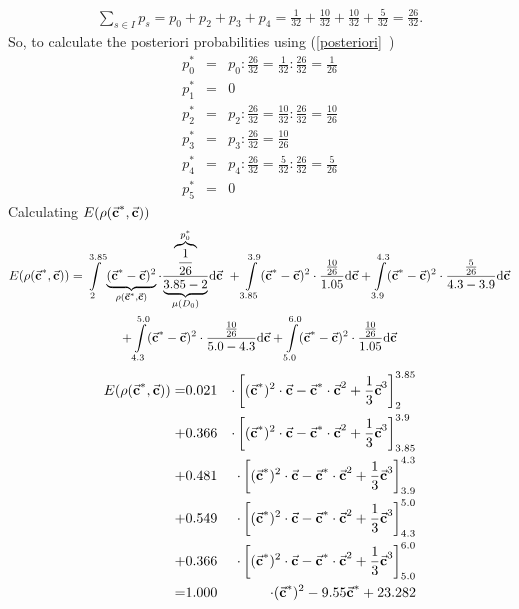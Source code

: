 \begin{gather*}
\sum\limits_{s \in I}p_{s}=p_{0}+p_{2}+p_{3}+p_{4}= \frac{1}{32} + \frac{10}{32} + \frac{10}{32} + \frac{5}{32} = \frac{26}{32}.
\end{gather*}
So, to calculate the posteriori probabilities using (\vref{posteriori}~)
\begin{eqnarray*}
p_{0}^{*} &=& p_{0}: \frac{26}{32} = \frac{1}{32} : \frac{26}{32} = \frac{1}{26} \\
p_{1}^{*} &=& 0 \\
p_{2}^{*} &=& p_{2}: \frac{26}{32} = \frac{10}{32} : \frac{26}{32} = \frac{10}{26} \\
p_{3}^{*} &=& p_{3}: \frac{26}{32} = \frac{10}{26} \\
p_{4}^{*} &=& p_{4}: \frac{26}{32} = \frac{5}{32} : \frac{26}{32} = \frac{5}{26} \\
p_{5}^{*} &=& 0
\end{eqnarray*}
Calculating $E(\rho(\vec{\textbf{c}}^{*},\vec{\textbf{c}}))$
\begin{gather*}
E(\rho(\vec{\textbf{c}}^{*},\vec{\textbf{c}})) = \int\limits_{2}^{3.85} \underbrace{(\vec{\textbf{c}}^{*}-\vec{\textbf{c}})^{2}}_{\rho(\vec{\textbf{c}}^{*},\vec{\textbf{c}})} \cdot \frac{\overbrace{\frac{1}{26}}^{p_{0}^{*}}}{\underbrace{3.85-2}_{\mu(D_{0})}} \mathrm{d}\vec{\textbf{c}} \ + \int\limits_{3.85}^{3.9} (\vec{\textbf{c}}^{*}-\vec{\textbf{c}})^{2} \cdot \frac{\frac{10}{26}}{1.05} \mathrm{d}\vec{\textbf{c}} + \int\limits_{3.9}^{4.3} (\vec{\textbf{c}}^{*}-\vec{\textbf{c}})^{2} \cdot \frac{\frac{5}{26}}{4.3-3.9} \mathrm{d}\vec{\textbf{c}} \\
+ \int\limits_{4.3}^{5.0} (\vec{\textbf{c}}^{*}-\vec{\textbf{c}})^{2} \cdot \frac{\frac{10}{26}}{5.0-4.3} \mathrm{d}\vec{\textbf{c}} + \int\limits_{5.0}^{6.0} (\vec{\textbf{c}}^{*}-\vec{\textbf{c}})^{2} \cdot \frac{\frac{10}{26}}{1.05}  \mathrm{d}\vec{\textbf{c}}
\end{gather*}
\begin{eqnarray*}
E(\rho(\vec{\textbf{c}}^{*},\vec{\textbf{c}})) =& 0.021 & \cdot\left[ (\vec{\textbf{c}}^{*})^{2} \cdot \vec{\textbf{c}} - \vec{\textbf{c}}^{*} \cdot \vec{\textbf{c}}^{2} + \frac{1}{3} \vec{\textbf{c}}^{3}\right]_{2}^{3.85}  \\
+ & 0.366 &\cdot\left[ (\vec{\textbf{c}}^{*})^{2} \cdot \vec{\textbf{c}} - \vec{\textbf{c}}^{*} \cdot \vec{\textbf{c}}^{2} + \frac{1}{3} \vec{\textbf{c}}^{3} \right]_{3.85}^{3.9} \\
+ & 0.481 &\cdot\left[ (\vec{\textbf{c}}^{*})^{2} \cdot \vec{\textbf{c}} - \vec{\textbf{c}}^{*} \cdot \vec{\textbf{c}}^{2} + \frac{1}{3} \vec{\textbf{c}}^{3} \right]_{3.9}^{4.3}  \\
+ & 0.549 &\cdot\left[ (\vec{\textbf{c}}^{*})^{2} \cdot \vec{\textbf{c}} - \vec{\textbf{c}}^{*} \cdot \vec{\textbf{c}}^{2} + \frac{1}{3} \vec{\textbf{c}}^{3} \right]_{4.3}^{5.0}  \\
+ & 0.366 &\cdot\left[ (\vec{\textbf{c}}^{*})^{2} \cdot \vec{\textbf{c}} - \vec{\textbf{c}}^{*} \cdot \vec{\textbf{c}}^{2} + \frac{1}{3} \vec{\textbf{c}}^{3} \right]_{5.0}^{6.0}  \\
= & 1.000 &\cdot(\vec{\textbf{c}}^{*})^{2}-9.55\vec{\textbf{c}}^{*} + 23.282
\end{eqnarray*}

